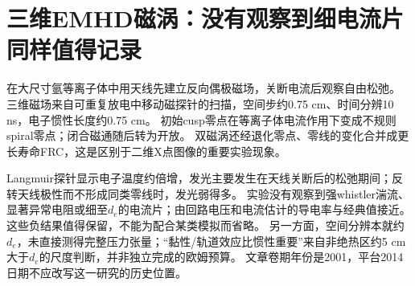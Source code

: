 \section{三维EMHD磁涡：没有观察到细电流片同样值得记录}
\citet{F766}在大尺寸氩等离子体中用天线先建立反向偶极磁场，关断电流后观察自由松弛。
三维磁场来自可重复放电中移动磁探针的扫描，空间步约0.75 cm、时间分辨10 ns，电子惯性长度约0.75 cm。
初始cusp零点在等离子体电流作用下变成不规则spiral零点；闭合磁通随后转为开放。
双磁涡还经退化零点、零线的变化合并成更长寿命FRC，这是区别于二维X点图像的重要实验现象。

Langmuir探针显示电子温度约倍增，发光主要发生在天线关断后的松弛期间；反转天线极性而不形成同类零线时，发光弱得多。
实验没有观察到强whistler湍流、显著异常电阻或细至$d_e$的电流片；由回路电压和电流估计的导电率与经典值接近。
这些负结果值得保留，不能为配合某类模拟而省略。
另一方面，空间分辨本就约$d_e$，未直接测得完整压力张量；“黏性/轨道效应比惯性重要”来自非绝热区约5 cm大于$d_e$的尺度判断，并非独立完成的欧姆预算。
文章卷期年份是2001，平台2014日期不应改写这一研究的历史位置。

